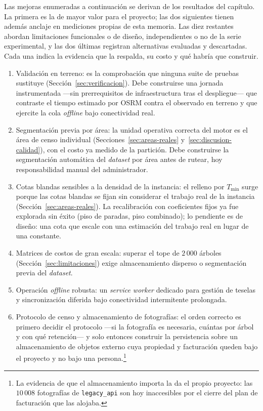 Las mejoras enumeradas a continuación se derivan de los resultados del capítulo. La primera es la de
mayor valor para el proyecto; las dos siguientes tienen además anclaje en mediciones propias de esta
memoria. Las diez restantes abordan limitaciones funcionales o de diseño, independientes o no de la
serie experimental, y las dos últimas registran alternativas evaluadas y descartadas. Cada una
indica la evidencia que la respalda, su costo y qué habría que construir.

\begin{enumerate}
  \item Validación en terreno: es la comprobación que ninguna suite de pruebas sustituye
      (Sección~\ref{sec:verificacion}). Debe construirse una jornada instrumentada ---sin
      prerrequisitos de infraestructura tras el despliegue--- que contraste el tiempo estimado por
      OSRM contra el observado en terreno y que
      ejercite la cola \textit{offline} bajo conectividad real.

  \item Segmentación previa por área: la unidad operativa correcta del motor es el área de censo
      individual (Secciones~\ref{sec:areas-reales} y~\ref{sec:discusion-calidad}), con el costo ya
      medido de la partición. Debe construirse la segmentación automática del \textit{dataset} por
      área antes de rutear, hoy responsabilidad manual del administrador.

  \item Cotas blandas sensibles a la densidad de la instancia: el relleno por $T_{\min}$ surge
      porque las cotas blandas se fijan sin considerar el trabajo real de la instancia
      (Sección~\ref{sec:areas-reales}). La recalibración con coeficientes fijos ya fue explorada
      sin éxito (piso de paradas, piso combinado); lo pendiente es de diseño: una cota que escale
      con una estimación del trabajo real en lugar de una constante.

  \item Matrices de costos de gran escala: superar el tope de $2\,000$ árboles
      (Sección~\ref{sec:limitaciones}) exige almacenamiento disperso o segmentación previa del
      \textit{dataset}.

  \item Operación \textit{offline} robusta: un \textit{service worker} dedicado para gestión de
      teselas y sincronización diferida bajo conectividad intermitente prolongada.

  \item Protocolo de censo y almacenamiento de fotografías: el orden correcto es primero decidir el
      protocolo ---si la fotografía es necesaria, cuántas por árbol y con qué retención--- y solo
      entonces construir la persistencia sobre un almacenamiento de objetos externo cuya propiedad
      y facturación queden bajo el proyecto y no bajo una persona.\footnote{La evidencia de que el
      almacenamiento importa la da el propio proyecto: las $10\,008$ fotografías de
      \texttt{legacy\_api} son hoy inaccesibles por el cierre del plan de facturación que las
      alojaba.}


\end{enumerate}
